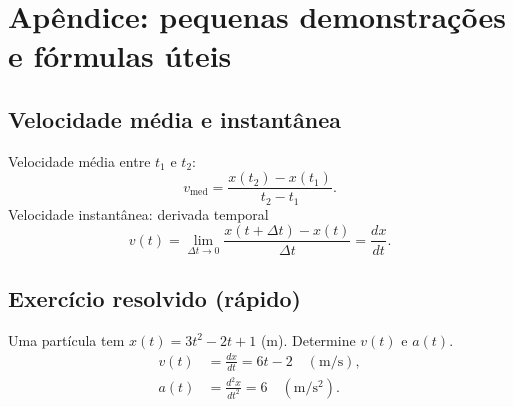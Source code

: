 \documentclass[a4paper,12pt]{article}
\begin{document}
	\section{Apêndice: pequenas demonstra\c{c}\~oes e fórmulas úteis}
	\subsection{Velocidade média e instantânea}
	Velocidade média entre $t_1$ e $t_2$:
	\[ v_{\mathrm{med}}=\frac{x(t_2)-x(t_1)}{t_2-t_1}. \]
	Velocidade instantânea: derivada temporal
	\[ v(t)=\lim_{\Delta t\to 0}\frac{x(t+\Delta t)-x(t)}{\Delta t}=\frac{dx}{dt}. \]
	
	\subsection{Exercício resolvido (rápido)}
	Uma partícula tem $x(t)=3t^2-2t+1$ (m). Determine $v(t)$ e $a(t)$.
	\begin{align*}
		v(t) &= \frac{dx}{dt} = 6t-2 \quad(\mathrm{m/s}),\\
		a(t) &= \frac{d^2x}{dt^2} = 6 \quad(\mathrm{m/s^2}).
	\end{align*}
	
	\bigskip
	
\end{document}
